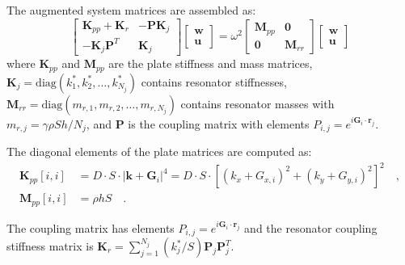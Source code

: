\documentclass[review,numbers,sort&compress]{elsarticle}
\begin{document}
{The augmented system matrices are assembled as:
\begin{equation}
\begin{bmatrix}
\mathbf{K}_{pp} + \mathbf{K}_r & -\mathbf{P}\mathbf{K}_j \\
-\mathbf{K}_j\mathbf{P}^T & \mathbf{K}_j
\end{bmatrix}
\begin{bmatrix}
\mathbf{w} \\ \mathbf{u}
\end{bmatrix} = \omega^2
\begin{bmatrix}
\mathbf{M}_{pp} & \mathbf{0} \\
\mathbf{0} & \mathbf{M}_{rr}
\end{bmatrix}
\begin{bmatrix}
\mathbf{w} \\ \mathbf{u}
\end{bmatrix}
\label{eq:augmented_eigenvalue_app}
\end{equation}
where $\mathbf{K}_{pp}$ and $\mathbf{M}_{pp}$ are the plate stiffness and mass matrices, $\mathbf{K}_j = \text{diag}(k_1^*, k_2^*, \ldots, k_{N_j}^*)$ contains resonator stiffnesses, $\mathbf{M}_{rr} = \text{diag}(m_{r,1}, m_{r,2}, \ldots, m_{r,N_j})$ contains resonator masses with $m_{r,j} = \gamma \rho S h / N_j$, and $\mathbf{P}$ is the coupling matrix with elements $P_{i,j} = e^{i\mathbf{G}_i \cdot \mathbf{r}_j}$.

The diagonal elements of the plate matrices are computed as:
\begin{align}
\mathbf{K}_{pp}[i,i] &= D \cdot S \cdot |\mathbf{k} + \mathbf{G}_i|^4 = D \cdot S \cdot [(k_x + G_{x,i})^2 + (k_y + G_{y,i})^2]^2 \quad,  \label{eq:stiffness_diagonal_app}\\
\mathbf{M}_{pp}[i,i] &= \rho h S \quad.  \label{eq:mass_diagonal_app}
\end{align}

The coupling matrix has elements $P_{i,j} = e^{i\mathbf{G}_i \cdot \mathbf{r}_j}$ and the resonator coupling stiffness matrix is $\mathbf{K}_r = \sum_{j=1}^{N_j} (k_j^*/S) \mathbf{P}_j \mathbf{P}_j^T$.

}
\end{document}
